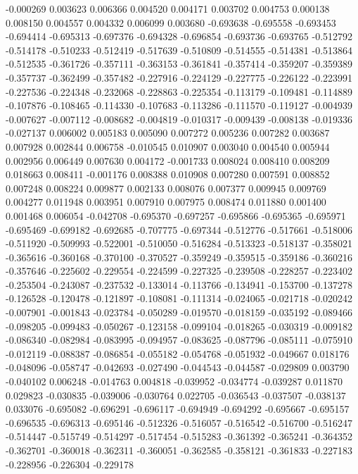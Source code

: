 -0.000269
0.003623
0.006366
0.004520
0.004171
0.003702
0.004753
0.000138
0.008150
0.004557
0.004332
0.006099
0.003680
-0.693638
-0.695558
-0.693453
-0.694414
-0.695313
-0.697376
-0.694328
-0.696854
-0.693736
-0.693765
-0.512792
-0.514178
-0.510233
-0.512419
-0.517639
-0.510809
-0.514555
-0.514381
-0.513864
-0.512535
-0.361726
-0.357111
-0.363153
-0.361841
-0.357414
-0.359207
-0.359389
-0.357737
-0.362499
-0.357482
-0.227916
-0.224129
-0.227775
-0.226122
-0.223991
-0.227536
-0.224348
-0.232068
-0.228863
-0.225354
-0.113179
-0.109481
-0.114889
-0.107876
-0.108465
-0.114330
-0.107683
-0.113286
-0.111570
-0.119127
-0.004939
-0.007627
-0.007112
-0.008682
-0.004819
-0.010317
-0.009439
-0.008138
-0.019336
-0.027137
0.006002
0.005183
0.005090
0.007272
0.005236
0.007282
0.003687
0.007928
0.002844
0.006758
-0.010545
0.010907
0.003040
0.004540
0.005944
0.002956
0.006449
0.007630
0.004172
-0.001733
0.008024
0.008410
0.008209
0.018663
0.008411
-0.001176
0.008388
0.010908
0.007280
0.007591
0.008852
0.007248
0.008224
0.009877
0.002133
0.008076
0.007377
0.009945
0.009769
0.004277
0.011948
0.003951
0.007910
0.007975
0.008474
0.011880
0.001400
0.001468
0.006054
-0.042708
-0.695370
-0.697257
-0.695866
-0.695365
-0.695971
-0.695469
-0.699182
-0.692685
-0.707775
-0.697344
-0.512776
-0.517661
-0.518006
-0.511920
-0.509993
-0.522001
-0.510050
-0.516284
-0.513323
-0.518137
-0.358021
-0.365616
-0.360168
-0.370100
-0.370527
-0.359249
-0.359515
-0.359186
-0.360216
-0.357646
-0.225602
-0.229554
-0.224599
-0.227325
-0.239508
-0.228257
-0.223402
-0.253504
-0.243087
-0.237532
-0.133014
-0.113766
-0.134941
-0.153700
-0.137278
-0.126528
-0.120478
-0.121897
-0.108081
-0.111314
-0.024065
-0.021718
-0.020242
-0.007901
-0.001843
-0.023784
-0.050289
-0.019570
-0.018159
-0.035192
-0.089466
-0.098205
-0.099483
-0.050267
-0.123158
-0.099104
-0.018265
-0.030319
-0.009182
-0.086340
-0.082984
-0.083995
-0.094957
-0.083625
-0.087796
-0.085111
-0.075910
-0.012119
-0.088387
-0.086854
-0.055182
-0.054768
-0.051932
-0.049667
0.018176
-0.048096
-0.058747
-0.042693
-0.027490
-0.044543
-0.044587
-0.029809
0.003790
-0.040102
0.006248
-0.014763
0.004818
-0.039952
-0.034774
-0.039287
0.011870
0.029823
-0.030835
-0.039006
-0.030764
0.022705
-0.036543
-0.037507
-0.038137
0.033076
-0.695082
-0.696291
-0.696117
-0.694949
-0.694292
-0.695667
-0.695157
-0.696535
-0.696313
-0.695146
-0.512326
-0.516057
-0.516542
-0.516700
-0.516247
-0.514447
-0.515749
-0.514297
-0.517454
-0.515283
-0.361392
-0.365241
-0.364352
-0.362701
-0.360018
-0.362311
-0.360051
-0.362585
-0.358121
-0.361833
-0.227183
-0.228956
-0.226304
-0.229178
